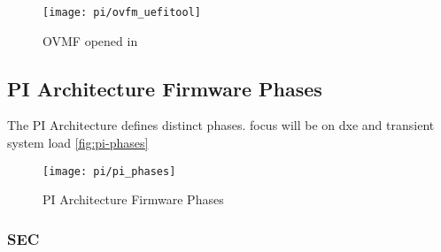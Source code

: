 \begin{figure}[htb]%
    \centering%
    \texttt{[image: pi/ovfm\_uefitool]}%
    \caption{\ac{OVMF} opened in }%
    \label{fig:ovmf-in-uefitool}%
\end{figure}


\subsection{\acs{PI} Architecture Firmware Phases}

The \ac{PI} Architecture defines distinct phases.
focus will be on dxe and transient system load
\autoref{fig:pi-phases}



\begin{figure}[htb]%
    \centering%
    \texttt{[image: pi/pi\_phases]}%
    \caption{\ac{PI} Architecture Firmware Phases \cite[Figure 2-1]{pi-spec}}%
    \label{fig:pi-phases}%
\end{figure}


\subsubsection{\acf{SEC}}



